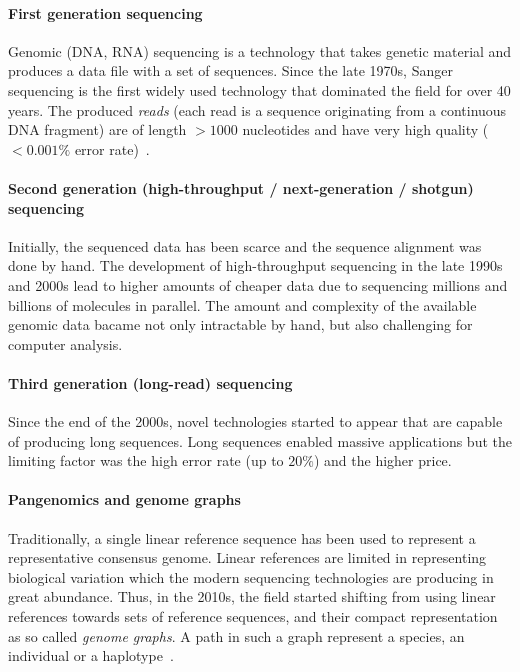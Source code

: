 \paragraph{First generation sequencing}
Genomic (DNA, RNA) sequencing is a technology that takes genetic material and
produces a data file with a set of sequences. Since the late 1970s, Sanger
sequencing is the first widely used technology that dominated the field for over
40 years. The produced \emph{reads} (each read is a sequence originating from a
continuous DNA fragment) are of length $>1000$ nucleotides and have very high
quality ($<0.001\%$ error rate)~\citep{shendure2008next}.

\paragraph{Second generation (high-throughput / next-generation / shotgun) sequencing}
Initially, the sequenced data has been scarce and the sequence alignment was
done by hand. The development of high-throughput sequencing in the late 1990s
and 2000s lead to higher amounts of cheaper data due to sequencing millions and
billions of molecules in parallel. The amount and complexity of the available
genomic data bacame not only intractable by hand, but also challenging for
computer analysis.

\paragraph{Third generation (long-read) sequencing}
Since the end of the 2000s, novel technologies started to appear that are
capable of producing long sequences. Long sequences enabled massive applications
but the limiting factor was the high error rate (up to $20\%$) and the higher
price.

\paragraph{Pangenomics and genome graphs}
Traditionally, a single linear reference sequence has been used to represent a
representative consensus genome. Linear references are limited in representing
biological variation which the modern sequencing technologies are producing in
great abundance. Thus, in the 2010s, the field started shifting from using
linear references towards sets of reference sequences, and their compact
representation as so called \emph{genome graphs}. A path in such a graph
represent a species, an individual or a
haplotype~\cite{dilthey_improved_2015,paten_genome_2017}.

